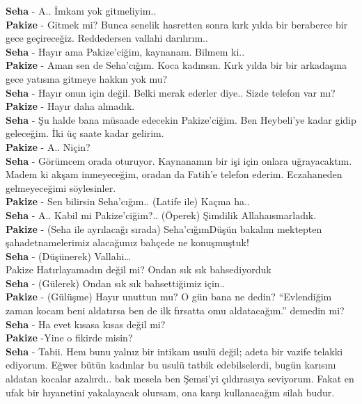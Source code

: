 \documentclass[]{book}
\begin{document}
\textbf{Seha} - A.. İmkanı yok gitmeliyim..\\
\textbf{Pakize} - Gitmek mi? Bunca senelik hasretten sonra kırk yılda bir beraberce bir gece geçireceğiz. Reddedersen vallahi darılırım..\\
\textbf{Seha} - Hayır ama Pakize'ciğim, kaynanam. Bilmem ki..\\
\textbf{Pakize} - Aman sen de Seha'cığım. Koca kadınsın. Kırk yılda bir bir arkadaşına gece yatısına gitmeye hakkın yok mu?\\
\textbf{Seha} - Hayır onun için değil. Belki merak ederler diye.. Sizde telefon var mı?
\textbf{Pakize} - Hayır daha almadık.\\
\textbf{Seha} - Şu halde bana müsaade edecekin Pakize'ciğim. Ben Heybeli'ye kadar gidip geleceğim. İki üç saate kadar gelirim.\\
\textbf{Pakize} - A.. Niçin?\\
\textbf{Seha} - Görümcem orada oturuyor. Kaynanamın bir işi için onlara uğrayacaktım. Madem ki akşam inmeyeceğim, oradan da Fatih'e telefon ederim. Eczahaneden gelmeyeceğimi söylesinler.\\
\textbf{Pakize} - Sen bilirsin Seha'cığım.. (Latife ile) Kaçma ha..\\
\textbf{Seha} - A.. Kabil mi Pakize'ciğim?.. (Öperek) Şimdilik Allahaısmarladık.\\
\textbf{Pakize} - (Seha ile ayrılacağı sırada) Seha'cığımDüşün bakalım mektepten şahadetnamelerimiz alacağımız bahçede ne konuşmuştuk!\\
\textbf{Seha} - (Düşünerek) Vallahi\ldots{}\\
Pakize Hatırlayamadın değil mi? Ondan sık sık bahsediyorduk\\
\textbf{Seha} - (Gülerek) Ondan sık sık bahsettiğimiz için..\\
\textbf{Pakize} - (Gülüşme) Hayır unuttun mu? O gün bana ne dedin? ``Evlendiğim zaman kocam beni aldatırsa ben de ilk fırsatta omu aldatacağım.'' demedin mi?\\
\textbf{Seha} - Ha evet kısasa kısas değil mi?\\
\textbf{Pakize} -Yine o fikirde misin?\\
\textbf{Seha} - Tabii. Hem bunu yalnız bir intikam usulü değil; adeta bir vazife telakki ediyorum. Eğwer bütün kadınlar bu usulü tatbik edebilselerdi, bugün karısını aldatan kocalar azalırdı.. bak mesela ben Şemsi'yi çıldırasıya seviyorum. Fakat en ufak bir hıyanetini yakalayacak olursam, ona karşı kullanacağım silah budur.\\
\end{document}
